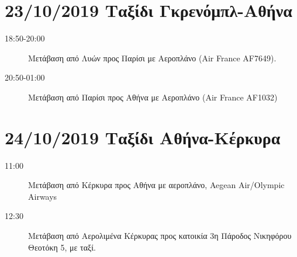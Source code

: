 \section{23/10/2019 Ταξίδι Γκρενόμπλ-Αθήνα}
\label{sec:orgdb9bfdf}

\begin{description}
\item[{18:50-20:00}] Μετάβαση από Λυών προς Παρίσι με Αεροπλάνο (Air France AF7649).
\item[{20:50-01:00}] Μετάβαση από Παρίσι προς Αθήνα με Αεροπλάνο (Air France AF1032)
\end{description}

\section{24/10/2019 Ταξίδι Αθήνα-Κέρκυρα}
\label{sec:orgc75be8f}

\begin{description}
\item[{11:00}] Μετάβαση από Κέρκυρα προς Αθήνα με αεροπλάνο, Aegean Air/Olympic Airways
\item[{12:30}] Μετάβαση από Αερολιμένα Κέρκυρας προς κατοικία 3η Πάροδος Νικηφόρου Θεοτόκη 5, με ταξί.
\end{description}
